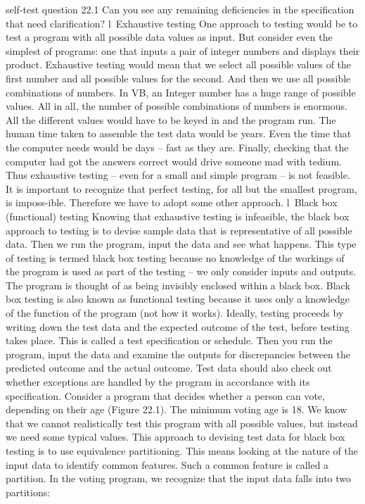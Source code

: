 self-test question
22.1	Can you see any remaining deﬁciencies in the speciﬁcation that need clariﬁcation?
l Exhaustive testing
One approach to testing would be to test a program with all possible data values as input. But consider even the simplest of programs: one that inputs a pair of integer numbers and displays their product. Exhaustive testing would mean that we select all possible values of the ﬁrst number and all possible values for the second. And then we use all possible combinations of numbers. In VB, an Integer number has a huge range of possible values. All in all, the number of possible combinations of numbers is enormous. All the different values would have to be keyed in and the program run. The human time taken to assemble the test data would be years. Even the time that the computer needs would be days – fast as they are. Finally, checking that the computer had got the answers correct would drive someone mad with tedium.
Thus exhaustive testing – even for a small and simple program – is not feasible. It is important to recognize that perfect testing, for all but the smallest program, is imposs-ible. Therefore we have to adopt some other approach.
l Black box (functional) testing
Knowing that exhaustive testing is infeasible, the black box approach to testing is to devise sample data that is representative of all possible data. Then we run the program, input the data and see what happens. This type of testing is termed black box testing because no knowledge of the workings of the program is used as part of the testing – we only consider inputs and outputs. The program is thought of as being invisibly enclosed within a black box. Black box testing is also known as functional testing because it uses only a knowledge of the function of the program (not how it works).
Ideally, testing proceeds by writing down the test data and the expected outcome of the test, before testing takes place. This is called a test speciﬁcation or schedule. Then you run the program, input the data and examine the outputs for discrepancies between the predicted outcome and the actual outcome. Test data should also check out whether exceptions are handled by the program in accordance with its speciﬁcation.
Consider a program that decides whether a person can vote, depending on their age (Figure 22.1). The minimum voting age is 18.
We know that we cannot realistically test this program with all possible values, but instead we need some typical values. This approach to devising test data for black box testing is to use equivalence partitioning. This means looking at the nature of the input data to identify common features. Such a common feature is called a partition. In the voting program, we recognize that the input data falls into two partitions:
